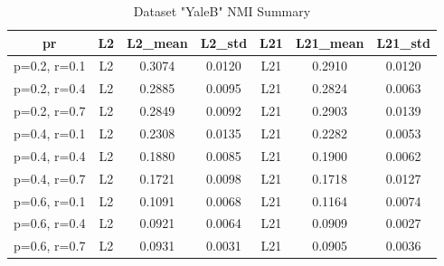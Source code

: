 \begin{table}[p]
\centering
\begin{tabular}{c c c c c c c}
\hline
\textbf{pr} & \textbf{L2} & \textbf{L2\_mean} & \textbf{L2\_std} & \textbf{L21} & \textbf{L21\_mean} & \textbf{L21\_std} \\
\hline
p=0.2, r=0.1 & L2 & 0.3074 & 0.0120 & L21 & 0.2910 & 0.0120 \\
p=0.2, r=0.4 & L2 & 0.2885 & 0.0095 & L21 & 0.2824 & 0.0063 \\
p=0.2, r=0.7 & L2 & 0.2849 & 0.0092 & L21 & 0.2903 & 0.0139 \\
p=0.4, r=0.1 & L2 & 0.2308 & 0.0135 & L21 & 0.2282 & 0.0053 \\
p=0.4, r=0.4 & L2 & 0.1880 & 0.0085 & L21 & 0.1900 & 0.0062 \\
p=0.4, r=0.7 & L2 & 0.1721 & 0.0098 & L21 & 0.1718 & 0.0127 \\
p=0.6, r=0.1 & L2 & 0.1091 & 0.0068 & L21 & 0.1164 & 0.0074 \\
p=0.6, r=0.4 & L2 & 0.0921 & 0.0064 & L21 & 0.0909 & 0.0027 \\
p=0.6, r=0.7 & L2 & 0.0931 & 0.0031 & L21 & 0.0905 & 0.0036 \\
\hline
\end{tabular}
\caption{Dataset "YaleB" NMI Summary}
\label{tab:yaleb_nmi}
\end{table}



